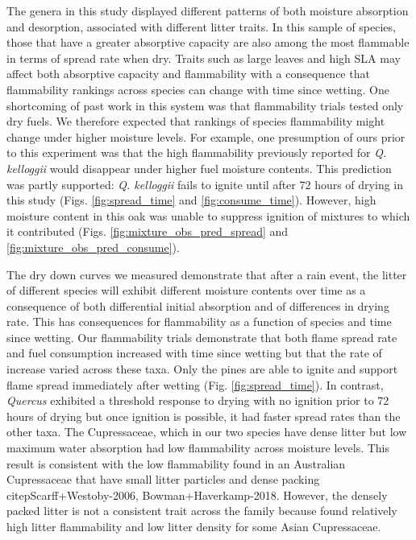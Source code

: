 \documentclass[letterpaper,12pt]{article}
\begin{document}
The genera in this study displayed different patterns of both moisture
absorption and desorption, associated with different litter traits. In this
sample of species, those that have a greater absorptive capacity are also among
the most flammable in terms of spread rate when dry. Traits such as large leaves and high SLA may affect both absorptive capacity and flammability with a consequence that flammability rankings across species can change with time since wetting. One shortcoming of past
work in this system \citep{Magalhaes+Schwilk-2012} was that flammability trials
tested only dry fuels. We therefore expected that rankings of species
flammability might change under higher moisture levels. For
example, one presumption of ours prior to this experiment was that the high
flammability previously reported for \emph{Q. kelloggii}
\citep{Magalhaes+Schwilk-2012} would disappear under higher fuel moisture
contents. This prediction was partly supported: \emph{Q. kelloggii} fails to
ignite until after 72 hours of drying in this study (Figs.
\ref{fig:spread_time} and \ref{fig:consume_time}). However, high moisture
content in this oak was unable to suppress ignition of mixtures to which it
contributed (Figs. \ref{fig:mixture_obs_pred_spread} and
\ref{fig:mixture_obs_pred_consume}).

The dry down curves we measured demonstrate that after a rain event, the litter
of different species will exhibit different moisture contents over time as a
consequence of both differential initial absorption and of differences in
drying rate. This has consequences for flammability as a function of species
and time since wetting. Our flammability trials demonstrate that both flame
spread rate and fuel consumption increased with time since wetting but that the
rate of increase varied across these taxa. Only the pines are able to ignite
and support flame spread immediately after wetting (Fig.
\ref{fig:spread_time}). In contrast, \emph{Quercus} exhibited a threshold
response to drying with no ignition prior to 72 hours of drying but once
ignition is possible, it had faster spread rates than the other taxa. The
Cupressaceae, which in our two species have dense litter but low maximum water
absorption had low flammability across moisture levels. This result is
consistent with the low flammability found in an Australian Cupressaceae that
have small litter particles and dense packing citep{Scarff+Westoby-2006,
  Bowman+Haverkamp-2018}. However, the densely packed litter is not a
consistent trait across the family because \citet{Cornwell+Elvira+etal-2015}
found relatively high litter flammability and low litter density for some Asian
Cupressaceae.
\end{document}
